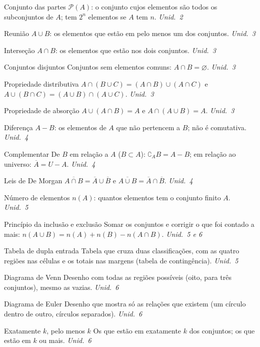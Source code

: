 \begin{glossario}
\item[Conjunto das partes] $\mathcal{P}(A)$: o conjunto cujos elementos são todos os subconjuntos de $A$; tem $2^n$ elementos se $A$ tem $n$. \hfill\emph{Unid.~2}
\item[Reunião] $A\cup B$: os elementos que estão em pelo menos um dos conjuntos. \hfill\emph{Unid.~3}
\item[Interseção] $A\cap B$: os elementos que estão nos dois conjuntos. \hfill\emph{Unid.~3}
\item[Conjuntos disjuntos] Conjuntos sem elementos comuns: $A\cap B=\varnothing$. \hfill\emph{Unid.~3}
\item[Propriedade distributiva] $A\cap(B\cup C)=(A\cap B)\cup(A\cap C)$ e $A\cup(B\cap C)=(A\cup B)\cap(A\cup C)$. \hfill\emph{Unid.~3}
\item[Propriedade de absorção] $A\cup(A\cap B)=A$ e $A\cap(A\cup B)=A$. \hfill\emph{Unid.~3}
\item[Diferença] $A-B$: os elementos de $A$ que não pertencem a $B$; não é comutativa. \hfill\emph{Unid.~4}
\item[Complementar] De $B$ em relação a $A$ ($B\subset A$): $\complement_A B=A-B$; em relação ao universo: $\overline{A}=U-A$. \hfill\emph{Unid.~4}
\item[Leis de De Morgan] $\overline{A\cap B}=\overline{A}\cup\overline{B}$ e $\overline{A\cup B}=\overline{A}\cap\overline{B}$. \hfill\emph{Unid.~4}
\item[Número de elementos] $n(A)$: quantos elementos tem o conjunto finito $A$. \hfill\emph{Unid.~5}
\item[Princípio da inclusão e exclusão] Somar os conjuntos e corrigir o que foi contado a mais: $n(A\cup B)=n(A)+n(B)-n(A\cap B)$. \hfill\emph{Unid.~5 e 6}
\item[Tabela de dupla entrada] Tabela que cruza duas classificações, com as quatro regiões nas células e os totais nas margens (tabela de contingência). \hfill\emph{Unid.~5}
\item[Diagrama de Venn] Desenho com todas as regiões possíveis (oito, para três conjuntos), mesmo as vazias. \hfill\emph{Unid.~6}
\item[Diagrama de Euler] Desenho que mostra só as relações que existem (um círculo dentro de outro, círculos separados). \hfill\emph{Unid.~6}
\item[Exatamente $k$, pelo menos $k$] Os que estão em exatamente $k$ dos conjuntos; os que estão em $k$ ou mais. \hfill\emph{Unid.~6}
\end{glossario}

